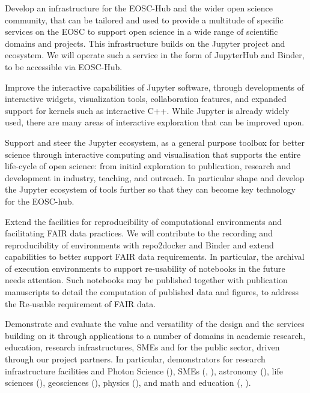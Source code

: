 \begin{compactenum}

\item \label{obj:deployment}
  Develop an infrastructure for the EOSC-Hub and the wider open
  science community, that can be tailored and used to provide a
  multitude of specific services on the EOSC to support open science
  in a wide range of scientific domains and projects. This infrastructure
  builds on the Jupyter project and ecosystem.
  We will operate such a service in the form of JupyterHub and Binder,
  to be accessible via EOSC-Hub.

\item \label{obj:interactivity}
  Improve the interactive capabilities of Jupyter software,
  through developments of interactive widgets,
  visualization tools, collaboration features,
  and expanded support for kernels such as interactive C++.
  While Jupyter is already widely used, there are many areas
  of interactive exploration that can be improved upon.

\item \label{obj:jupyter}
  Support and steer the Jupyter ecosystem, as a general purpose
  toolbox for better science through interactive computing and
  visualisation that supports the entire life-cycle of open science:
  from initial exploration to publication, research and development in
  industry, teaching, and outreach. In particular shape and develop
  the Jupyter ecosystem of tools further so that they can become key
  technology for the EOSC-hub.

\item \label{obj:reusability}
  Extend the facilities for reproducibility of computational environments
  and facilitating FAIR data practices.
  We will contribute to the recording and reproducibility
  of environments with repo2docker and Binder
  and extend capabilities to better support FAIR
  data requirements. In particular, the archival of execution
  environments to support re-usability of notebooks in the future
  needs attention. Such notebooks may be published together with
  publication manuscripts to detail the computation of published data
  and figures, to address the Re-usable requirement of FAIR data.

\item \label{obj:demonstrators}
  Demonstrate and evaluate the value and versatility of the design and
  the services building on it through applications to a number of
  domains in academic research, education, research infrastructures, SMEs and for
  the public sector, driven through our project partners. In
  particular, demonstrators for research infrastructure facilities and
  Photon Science (), SMEs (, ),
  astronomy (), life sciences (),
  geosciences (), physics (),
  and math and education (, ).


\end{compactenum}
